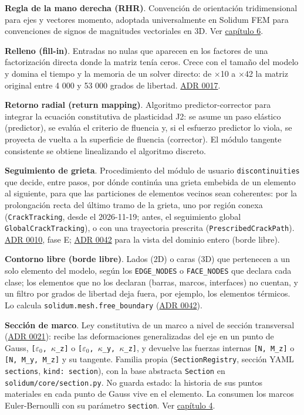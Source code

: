\documentclass[11pt,oneside]{report}
\begin{document}
\textbf{Regla de la mano derecha (RHR)}. Convención de orientación tridimensional para ejes y vectores momento, adoptada universalmente en Solidum FEM para convenciones de signos de magnitudes vectoriales en 3D. Ver \hyperref[cap:6]{capítulo 6}.

\textbf{Relleno (fill-in)}. Entradas no nulas que aparecen en los factores de una factorización directa donde la matriz tenía ceros. Crece con el tamaño del modelo y domina el tiempo y la memoria de un solver directo: de \ensuremath{\times}10 a \ensuremath{\times}42 la matriz original entre 4 000 y 53 000 grados de libertad. \hyperref[adr:0017]{ADR 0017}.

\textbf{Retorno radial (return mapping)}. Algoritmo predictor-corrector para integrar la ecuación constitutiva de plasticidad J2: se asume un paso elástico (predictor), se evalúa el criterio de fluencia y, si el esfuerzo predictor lo viola, se proyecta de vuelta a la superficie de fluencia (corrector). El módulo tangente consistente se obtiene linealizando el algoritmo discreto.

\textbf{Seguimiento de grieta}. Procedimiento del módulo de usuario \texttt{discontinuities} que decide, entre pasos, por dónde continúa una grieta embebida de un elemento al siguiente, para que las particiones de elementos vecinos sean coherentes: por la prolongación recta del último tramo de la grieta, uno por región conexa (\texttt{CrackTracking}, desde el 2026-11-19; antes, el seguimiento global \texttt{GlobalCrackTracking}), o con una trayectoria prescrita (\texttt{PrescribedCrackPath}). \hyperref[adr:0010]{ADR 0010}, fase E; \hyperref[adr:0042]{ADR 0042} para la vista del dominio entero (borde libre).

\textbf{Contorno libre (borde libre)}. Lados (2D) o caras (3D) que pertenecen a un solo elemento del modelo, según los \texttt{EDGE\_NODES} o \texttt{FACE\_NODES} que declara cada clase; los elementos que no los declaran (barras, marcos, interfaces) no cuentan, y un filtro por grados de libertad deja fuera, por ejemplo, los elementos térmicos. Lo calcula \texttt{solidum.\allowbreak{}mesh.\allowbreak{}free\_\allowbreak{}boundary} (\hyperref[adr:0042]{ADR 0042}).

\textbf{Sección de marco}. Ley constitutiva de un marco a nivel de sección transversal (\hyperref[adr:0021]{ADR 0021}): recibe las deformaciones generalizadas del eje en un punto de Gauss, \texttt{[\ensuremath{\varepsilon}\ensuremath{_{0}}, \ensuremath{\kappa}\_z]} o \texttt{[\ensuremath{\varepsilon}\ensuremath{_{0}}, \ensuremath{\kappa}\_y, \ensuremath{\kappa}\_z]}, y devuelve las fuerzas internas \texttt{[N, M\_z]} o \texttt{[N, M\_y, M\_z]} y su tangente. Familia propia (\texttt{SectionRegistry}, sección YAML \texttt{sections}, \texttt{kind: section}), con la base abstracta \texttt{Section} en \texttt{solidum/\allowbreak{}core/\allowbreak{}section.\allowbreak{}py}. No guarda estado: la historia de sus puntos materiales en cada punto de Gauss vive en el elemento. La consumen los marcos Euler-Bernoulli con su parámetro \texttt{section}. Ver \hyperref[cap:4]{capítulo 4}.
\end{document}
